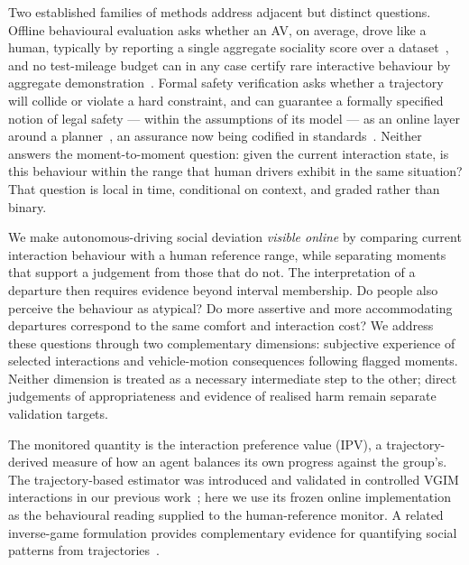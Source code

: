 \documentclass[12pt,a4paper]{article}
\begin{document}
Two established families of methods address adjacent but distinct questions. Offline behavioural
evaluation asks whether an AV, on average, drove like a human, typically by reporting a single
aggregate sociality score over a dataset~\cite{caesar2021nuplan, montali2023waymo, sagberg2015review,
francis2025principles}, and no test-mileage budget can in any case certify rare interactive behaviour
by aggregate demonstration~\cite{kalra2016driving, koopman2016challenges}. Formal safety verification
asks whether a trajectory will collide or violate a hard constraint, and can guarantee a formally
specified notion of legal safety --- within the assumptions of its model --- as an online layer
around a planner~\cite{pek2020online, shalevshwartz2017rss, althoff2014online,
ames2019control}, an assurance now being codified in standards~\cite{iso21448sotif, ul4600}. Neither
answers the moment-to-moment question: given the current interaction state, is this behaviour within
the range that human drivers exhibit in the same situation? That question is local in time, conditional on context, and
graded rather than binary.

We make autonomous-driving social deviation \emph{visible online} by comparing current interaction
behaviour with a human reference range, while separating moments that support a judgement from those
that do not. The interpretation of a departure then requires evidence beyond interval membership.
Do people also perceive the behaviour as atypical? Do more assertive and more accommodating
departures correspond to the same comfort and interaction cost? We address these questions through
two complementary dimensions: subjective experience of selected interactions and vehicle-motion
consequences following flagged moments. Neither dimension is treated as a necessary intermediate
step to the other; direct judgements of appropriateness and evidence of realised harm remain
separate validation targets.

The monitored quantity is the interaction preference value (IPV), a trajectory-derived measure of
how an agent balances its own progress against the group's. The trajectory-based estimator was
introduced and validated in controlled VGIM interactions in our previous work~\cite{zhao2024measuring};
here we use its frozen online implementation as the behavioural reading supplied to the
human-reference monitor. A related inverse-game formulation provides complementary evidence for
quantifying social patterns from trajectories~\cite{liu2024sociality}.
\end{document}
